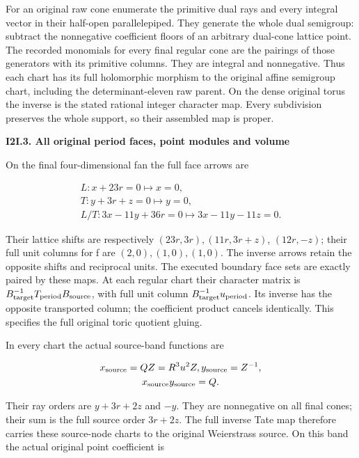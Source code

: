 For an original raw cone enumerate the primitive dual rays and
every integral vector in their half-open parallelepiped. They
generate the whole dual semigroup: subtract the nonnegative
coefficient floors of an arbitrary dual-cone lattice point.
The recorded monomials for every final regular cone are the
pairings of those generators with its primitive columns. They
are integral and nonnegative. Thus each chart has its full
holomorphic morphism to the original affine semigroup chart,
including the determinant-eleven raw parent. On the dense
original torus the inverse is the stated rational integer
character map. Every subdivision preserves the whole support,
so their assembled map is proper.

\par

\medskip\noindent\textbf{I2I.3. All original period faces, point modules and volume}

\par\nobreak

On the final four-dimensional fan the full face arrows are

\[
\begin{gathered}
L: x+23r=0 \longmapsto  x=0, \\
T: y+3r+z=0 \longmapsto  y=0, \\
L/T: 3x-11y+36r=0 \longmapsto  3x-11y-11z=0.
\end{gathered}
\]

Their lattice shifts are respectively \((23r,3r),(11r,3r+z)\),
\((12r,-z)\); their full unit columns for f are \((2,0),(1,0),(1,0)\).
The inverse arrows retain the opposite shifts and reciprocal
units. The executed boundary face sets are exactly paired by
these maps. At each regular chart their character matrix is
\(B_{\rm target}^{-1} T_{\rm period} B_{\rm source}\), with full unit column
\(B_{\rm target}^{-1} u_{\rm period}\). Its inverse has the opposite transported
column; the coefficient product cancels identically. This
specifies the full original toric quotient gluing.

In every chart the actual source-band functions are

\[
\begin{gathered}
x_{\rm source}=QZ=R^{3}u^{2} Z, y_{\rm source}=Z^{-1}, \\
x_{\rm source} y_{\rm source}=Q.
\end{gathered}
\]

Their ray orders are \(y+3r+2z\) and \(-y\). They are nonnegative on
all final cones; their sum is the full source order \(3r+2z\).
The full inverse Tate map therefore carries these source-node
charts to the original Weierstrass source. On this band the
actual original point coefficient is

